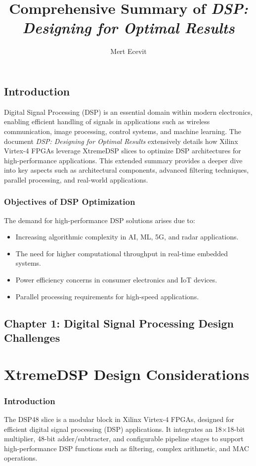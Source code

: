 \documentclass{article}
\title{Comprehensive Summary of \textit{DSP: Designing for Optimal Results}}
\author{Mert Ecevit}
\begin{document}
	
	\maketitle
	
	\tableofcontents
	\newpage
	
	\section{Introduction}
	Digital Signal Processing (DSP) is an essential domain within modern electronics, enabling efficient handling of signals in applications such as wireless communication, image processing, control systems, and machine learning. The document \textit{DSP: Designing for Optimal Results} extensively details how Xilinx Virtex-4 FPGAs leverage XtremeDSP slices to optimize DSP architectures for high-performance applications. This extended summary provides a deeper dive into key aspects such as architectural components, advanced filtering techniques, parallel processing, and real-world applications.
	
	\subsection{Objectives of DSP Optimization}
	The demand for high-performance DSP solutions arises due to:
	\begin{itemize}
		\item Increasing algorithmic complexity in AI, ML, 5G, and radar applications.
		\item The need for higher computational throughput in real-time embedded systems.
		\item Power efficiency concerns in consumer electronics and IoT devices.
		\item Parallel processing requirements for high-speed applications.
	\end{itemize}
	
	\newpage
	
	\section{Chapter 1: Digital Signal Processing Design Challenges}
	\chapter{XtremeDSP Design Considerations}
	
	\subsection{Introduction}
	The DSP48 slice is a modular block in Xilinx Virtex-4 FPGAs, designed for efficient digital signal processing (DSP) applications. It integrates an 18×18-bit multiplier, 48-bit adder/subtracter, and configurable pipeline stages to support high-performance DSP functions such as filtering, complex arithmetic, and MAC operations.
	
\end{document}
